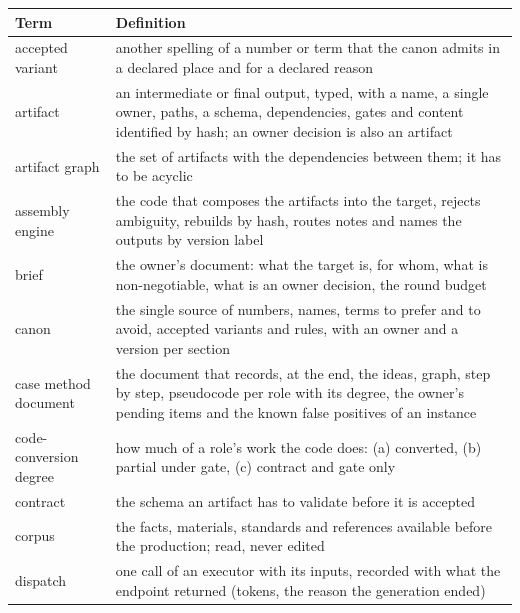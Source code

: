 \documentclass[
  american,
  10pt,
]{report}
\newcounter{none} %
\begin{document}
{\def\LTcaptype{none} %
\begin{longtable}[]{@{}
  >{\raggedright\arraybackslash}p{}
  >{\raggedright\arraybackslash}p{}@{}}
\toprule\noalign{}
\begin{minipage}[b]{\linewidth}\raggedright
Term
\end{minipage} & \begin{minipage}[b]{\linewidth}\raggedright
Definition
\end{minipage} \\
\midrule\noalign{}
\endhead
\bottomrule\noalign{}
\endlastfoot
accepted variant & another spelling of a number or term that the canon
admits in a declared place and for a declared reason \\
artifact & an intermediate or final output, typed, with a name, a single
owner, paths, a schema, dependencies, gates and content identified by
hash; an owner decision is also an artifact \\
artifact graph & the set of artifacts with the dependencies between
them; it has to be acyclic \\
assembly engine & the code that composes the artifacts into the target,
rejects ambiguity, rebuilds by hash, routes notes and names the outputs
by version label \\
brief & the owner's document: what the target is, for whom, what is
non-negotiable, what is an owner decision, the round budget \\
canon & the single source of numbers, names, terms to prefer and to
avoid, accepted variants and rules, with an owner and a version per
section \\
case method document & the document that records, at the end, the ideas,
graph, step by step, pseudocode per role with its degree, the owner's
pending items and the known false positives of an instance \\
code-conversion degree & how much of a role's work the code does: (a)
converted, (b) partial under gate, (c) contract and gate only \\
contract & the schema an artifact has to validate before it is
accepted \\
corpus & the facts, materials, standards and references available before
the production; read, never edited \\
dispatch & one call of an executor with its inputs, recorded with what
the endpoint returned (tokens, the reason the generation ended) \\

\end{longtable}}
\end{document}
